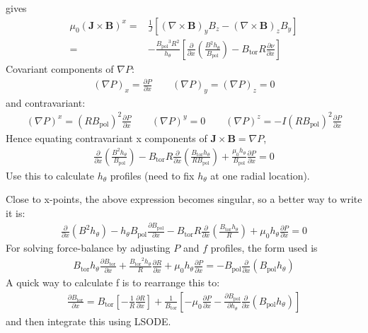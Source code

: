 \documentclass[12pt]{article}
\newcommand{\deriv}[2]{\ensuremath{\frac{\partial #1}{\partial #2}}}
\newcommand{\hthe}{\ensuremath{h_\theta}}
\newcommand{\Bp}{\ensuremath{B_{\text{pol}}}}
\newcommand{\Bt}{\ensuremath{B_{\text{tor}}}}
\newcommand{\ve}[1]{\ensuremath{\boldsymbol{#1}}}
\newcommand{\Bvec}{\ve{B}}
\newcommand{\Jvec}{\ve{J}}
\newcommand{\Curl}[1]{\ensuremath{\nabla\times #1 }}
\newcommand{\rbp}{\ensuremath{R\Bp}}
\newcommand{\rbpsq}{\ensuremath{\left(\rbp\right)^2}}
\begin{document}
%
gives
%
\begin{align*}
\mu_0 \left(\Jvec\times\Bvec\right)^x =&
    \frac{1}{J}\left[\left(\Curl{\Bvec}\right)_y B_z -
    \left(\Curl{\Bvec}\right)_z B_y \right]\\ =& -\frac{\Bp^3
    R^2}{\hthe}\left[\deriv{}{x}\left(\frac{B^2\hthe}{\Bp}\right) - \Bt
    R\deriv{\nu}{x}\right]
\end{align*}
%
Covariant components of $\nabla P$:
%
\begin{align*}
\left(\nabla P\right)_x = \deriv{P}{x} \qquad \left(\nabla P\right)_y =
\left(\nabla P\right)_z = 0
\end{align*}
%
and contravariant:
%
\begin{align*}
\left(\nabla P\right)^x = \rbpsq\deriv{P}{x} \qquad \left(\nabla P\right)^y = 0
\qquad \left(\nabla P\right)^z = -I\rbpsq\deriv{P}{x}
\end{align*}
%
Hence equating contravariant x components of $\Jvec\times\Bvec = \nabla P$,
%
\begin{align}
\deriv{}{x}\left(\frac{B^2\hthe}{\Bp}\right) - \Bt
R\deriv{}{x}\left(\frac{\Bt\hthe}{R\Bp}\right) +
\frac{\mu_0\hthe}{\Bp}\deriv{P}{x} = 0
\label{eq:xbalance}
\end{align}
%
Use this to calculate $\hthe$ profiles (need to fix $\hthe$ at one radial
location).

Close to x-points, the above expression becomes singular, so a better way to
write it is:
%
\begin{align*}
\deriv{}{x}\left(B^2\hthe\right) - \hthe\Bp\deriv{\Bp}{x} - \Bt
R\deriv{}{x}\left(\frac{\Bt\hthe}{R}\right) + \mu_0\hthe\deriv{P}{x} = 0
\end{align*}
%
For solving force-balance by adjusting $P$ and $f$ profiles, the form used is
%
\begin{align*}
\Bt\hthe\deriv{\Bt}{x} + \frac{\Bt^2\hthe}{R}\deriv{R}{x} +
\mu_0\hthe\deriv{P}{x} = -\Bp\deriv{}{x}\left(\Bp\hthe\right)
\end{align*}
%
A quick way to calculate f is to rearrange this to:
%
\begin{align*}
\deriv{\Bt}{x} = \Bt\left[-\frac{1}{R}\deriv{R}{x}\right] +
\frac{1}{\Bt}\left[-\mu_0\deriv{P}{x} -
\deriv{\Bp}{\hthe}\deriv{}{x}\left(\Bp\hthe\right)\right]
\end{align*}
%
and then integrate this using LSODE.
\end{document}

